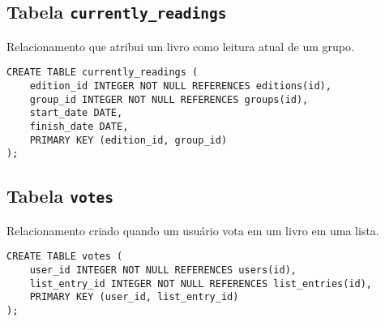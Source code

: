 \documentclass[12pt]{article}
\begin{document}
\subsection{Tabela \texttt{currently\_readings}}
Relacionamento que atribui um livro como leitura atual de um grupo.
\begin{lstlisting}
CREATE TABLE currently_readings (
    edition_id INTEGER NOT NULL REFERENCES editions(id),
    group_id INTEGER NOT NULL REFERENCES groups(id),
    start_date DATE,
    finish_date DATE,
    PRIMARY KEY (edition_id, group_id)
);
\end{lstlisting}

\subsection{Tabela \texttt{votes}}
Relacionamento criado quando um usuário vota em um livro em uma lista.
\begin{lstlisting}
CREATE TABLE votes (
    user_id INTEGER NOT NULL REFERENCES users(id),
    list_entry_id INTEGER NOT NULL REFERENCES list_entries(id),
    PRIMARY KEY (user_id, list_entry_id)
);
\end{lstlisting}
\end{document}
